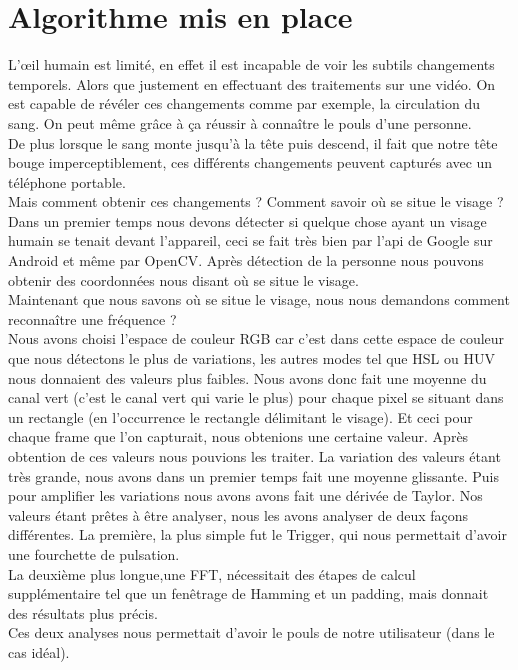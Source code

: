\section{Algorithme mis en place}

L’œil humain est limité, en effet il est incapable de voir les subtils changements temporels. Alors
que justement en effectuant des traitements sur une vidéo. On est capable de révéler ces changements
comme par exemple, la circulation du sang. On peut même grâce à ça réussir à connaître le pouls d'une
personne.
\\
De plus lorsque le sang monte jusqu'à la tête puis descend, il fait que notre tête bouge imperceptiblement, ces différents changements peuvent capturés avec un téléphone portable.
\\
Mais comment obtenir ces changements ? Comment savoir où se situe le visage ?\\

 Dans un premier temps nous devons détecter si quelque chose ayant un visage humain se tenait devant l'appareil, ceci se fait très bien par l'api de Google sur Android et même par OpenCV.
 Après détection de la personne nous pouvons obtenir des coordonnées nous disant où se situe le visage.\\
 Maintenant que nous savons où se situe le visage, nous nous demandons comment reconnaître une fréquence ?\\
 Nous avons choisi l'espace de couleur RGB car c'est dans cette espace de couleur que nous détectons le plus de variations, les autres modes tel que HSL ou HUV nous donnaient des valeurs plus faibles.
 Nous avons donc fait une moyenne du canal vert (c'est le canal vert qui varie le plus) pour chaque pixel se situant dans un rectangle (en l’occurrence le rectangle délimitant le visage).
 Et ceci pour chaque frame que l'on capturait, nous obtenions une certaine valeur.
 Après obtention de ces valeurs nous pouvions les traiter.
 La variation des valeurs étant très grande, nous avons dans un premier temps fait une moyenne glissante. Puis pour amplifier les variations nous avons avons fait une dérivée de Taylor.
 Nos valeurs étant prêtes à être analyser, nous les avons analyser de deux façons différentes.
 La première, la plus simple fut le Trigger, qui nous permettait d'avoir une fourchette de pulsation.\\ La deuxième plus longue,une FFT, nécessitait des étapes de calcul supplémentaire tel que un fenêtrage de Hamming et un padding, mais donnait des résultats plus précis.
 \\
 Ces deux analyses nous permettait d'avoir le pouls de notre utilisateur (dans le cas idéal).
 \\ 


